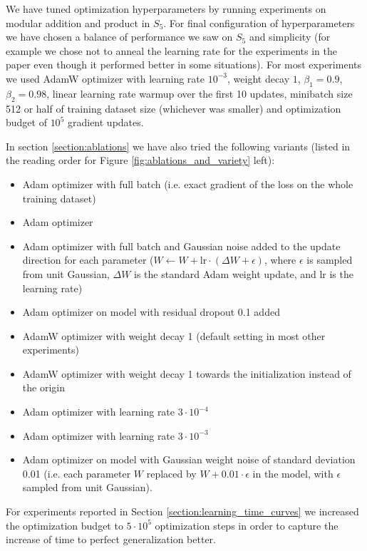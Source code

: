 \documentclass{article} %
\begin{document}
We have tuned optimization hyperparameters by running experiments on modular addition and product in $S_5$. For final configuration of hyperparameters we have chosen a balance of performance we saw on $S_5$ and simplicity (for example we chose not to anneal the learning rate for the experiments in the paper even though it performed better in some situations). For most experiments we used AdamW optimizer with learning rate $10^{-3}$, weight decay $1$, $\beta_1=0.9$, $\beta_2=0.98$, linear learning rate warmup over the first 10 updates, minibatch size 512 or half of training dataset size (whichever was smaller) and optimization budget of $10^5$ gradient updates.

In section \ref{section:ablations} we have also tried the following variants (listed in the reading order for Figure \ref{fig:ablations_and_variety} left):
\begin{itemize}
    \item Adam optimizer with full batch (i.e. exact gradient of the loss on the whole training dataset)
    \item Adam optimizer
    \item Adam optimizer with full batch and Gaussian noise added to the update direction for each parameter ($W\leftarrow W + \text{lr}\cdot(\Delta W + \epsilon)$, where $\epsilon$ is sampled from unit Gaussian, $\Delta W$ is the standard Adam weight update, and lr is the learning rate) 
    \item Adam optimizer on model with residual dropout 0.1 added
    \item AdamW optimizer with weight decay 1 (default setting in most other experiments)
    \item AdamW optimizer with weight decay 1 towards the initialization instead of the origin
    \item Adam optimizer with learning rate $3\cdot 10^{-4}$
    \item Adam optimizer with learning rate $3\cdot 10^{-3}$
    \item Adam optimizer on model with Gaussian weight noise of standard deviation 0.01 (i.e. each parameter $W$ replaced by $W+0.01\cdot\epsilon$ in the model, with $\epsilon$ sampled from unit Gaussian).
\end{itemize}

For experiments reported in Section \ref{section:learning_time_curves} we increased the optimization budget to $5\cdot 10^5$ optimization steps in order to capture the increase of time to perfect generalization better.
\end{document}
